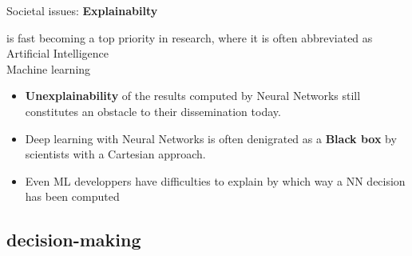 \documentclass[10pt,serif,mathserif,compress,hyperref={colorlinks}]{beamer}
\begin{document}
\begin{frame}{Societal issues: {\bf Explainabilty}}

   is fast becoming a top priority in research, where it is often
  abbreviated as \\
  \hspace*{10mm}{\bf xAI} \hspace*{10mm}{\bf Explainable} Artificial Intelligence\\
  \hspace*{10mm}{\bf iML} \hspace*{10mm}{\bf Interpretable} Machine learning
  \bigskip

  \begin{tcolorbox}[title={\bf Explainability}]
    \begin{itemize}
    \item {\bf Unexplainability} of the results computed by Neural Networks still constitutes an obstacle to their dissemination today.
    \item Deep learning with Neural Networks is often denigrated as a {\bf Black box} by scientists with a Cartesian approach.
    \item Even ML developpers have difficulties to explain by which way a NN decision has been computed
    \end{itemize}
  \end{tcolorbox}   
    
  
\end{frame}

\subsection{decision-making}
\end{document}
